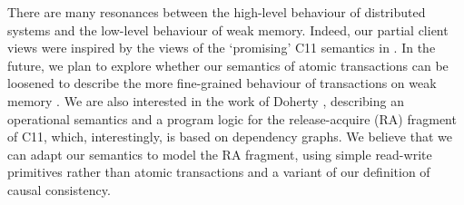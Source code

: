 There are many resonances between the high-level  behaviour
of distributed systems and the low-level behaviour  of weak
memory. Indeed, our partial client views were 
inspired by the views of  the `promising' C11 semantics in \cite{promises}. 
In the future, we plan to explore whether our semantics of atomic transactions can be loosened to describe the more fine-grained behaviour of transactions on weak
memory \cite{PSI-RA,SI-RA,DBLP:conf/pldi/ChongSW18}. 
We are also interested in the work of Doherty \etal\citet{op-semantics-c11-rar}, describing an
operational semantics and a program logic for the release-acquire (RA) fragment of C11, which, interestingly, 
is based on dependency graphs. 
We believe that we can adapt our semantics to model the RA fragment, using simple read-write
primitives rather than atomic transactions and a variant of our definition of causal consistency.%
